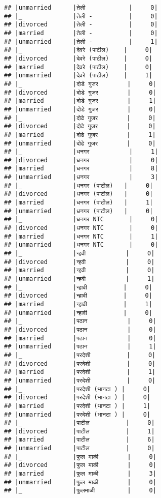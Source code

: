 \documentclass[
]{article}
\begin{document}
\begin{verbatim}
## |unmarried      |तेली            |     0|
## |_              |तेली -          |     0|
## |divorced       |तेली -          |     0|
## |married        |तेली -          |     0|
## |unmarried      |तेली -          |     1|
## |_              |देवरे (पाटील)    |     0|
## |divorced       |देवरे (पाटील)    |     0|
## |married        |देवरे (पाटील)    |     0|
## |unmarried      |देवरे (पाटील)    |     1|
## |_              |दोडे गुजर        |     0|
## |divorced       |दोडे गुजर        |     0|
## |married        |दोडे गुजर        |     1|
## |unmarried      |दोडे गुजर        |     0|
## |_              |दोढे गुजर        |     0|
## |divorced       |दोढे गुजर        |     0|
## |married        |दोढे गुजर        |     1|
## |unmarried      |दोढे गुजर        |     0|
## |_              |धनगर           |     1|
## |divorced       |धनगर           |     0|
## |married        |धनगर           |     8|
## |unmarried      |धनगर           |     3|
## |_              |धनगर (पाटील)   |     0|
## |divorced       |धनगर (पाटील)   |     0|
## |married        |धनगर (पाटील)   |     1|
## |unmarried      |धनगर (पाटील)   |     0|
## |_              |धनगर NTC       |     0|
## |divorced       |धनगर NTC       |     0|
## |married        |धनगर NTC       |     1|
## |unmarried      |धनगर NTC       |     0|
## |_              |न्हवी           |     0|
## |divorced       |न्हवी           |     0|
## |married        |न्हवी           |     0|
## |unmarried      |न्हवी           |     1|
## |_              |न्हावी          |     0|
## |divorced       |न्हावी          |     0|
## |married        |न्हावी          |     1|
## |unmarried      |न्हावी          |     0|
## |_              |पठान           |     0|
## |divorced       |पठान           |     0|
## |married        |पठान           |     0|
## |unmarried      |पठान           |     1|
## |_              |परदेशी          |     0|
## |divorced       |परदेशी          |     0|
## |married        |परदेशी          |     1|
## |unmarried      |परदेशी          |     0|
## |_              |परदेशी (भानटा ) |     0|
## |divorced       |परदेशी (भानटा ) |     0|
## |married        |परदेशी (भानटा ) |     1|
## |unmarried      |परदेशी (भानटा ) |     0|
## |_              |पाटील          |     0|
## |divorced       |पाटील          |     1|
## |married        |पाटील          |     6|
## |unmarried      |पाटील          |     0|
## |_              |फुल माळी        |     0|
## |divorced       |फुल माळी        |     0|
## |married        |फुल माळी        |     3|
## |unmarried      |फुल माळी        |     0|
## |_              |फुलमाळी         |     0|

\end{verbatim}
\end{document}
